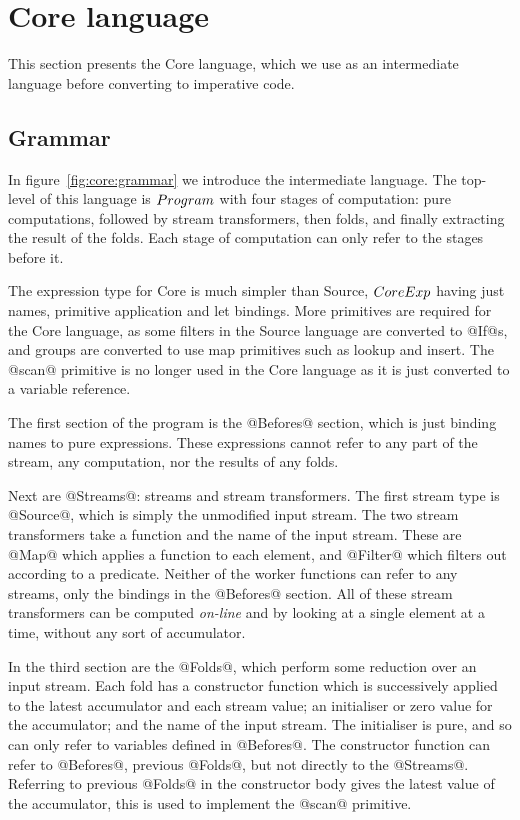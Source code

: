 \section{Core language}
\label{s:Core}

This section presents the Core language, which we use as an intermediate language before converting to imperative code.

\subsection{Grammar}



In figure~\ref{fig:core:grammar} we introduce the intermediate language.
The top-level of this language is $\mit{Program}$ with four stages of computation: pure computations, followed by stream transformers, then folds, and finally extracting the result of the folds.
Each stage of computation can only refer to the stages before it.

The expression type for Core is much simpler than Source, $\mit{CoreExp}$ having just names, primitive application and let bindings.
More primitives are required for the Core language, as some filters in the Source language are converted to @If@s, and groups are converted to use map primitives such as lookup and insert.
The @scan@ primitive is no longer used in the Core language as it is just converted to a variable reference.

The first section of the program is the @Befores@ section, which is just binding names to pure expressions.
These expressions cannot refer to any part of the stream, any computation, nor the results of any folds.

Next are @Streams@: streams and stream transformers.
The first stream type is @Source@, which is simply the unmodified input stream.
The two stream transformers take a function and the name of the input stream.
These are @Map@ which applies a function to each element, and @Filter@ which filters out according to a predicate.
Neither of the worker functions can refer to any streams, only the bindings in the @Befores@ section.
All of these stream transformers can be computed \emph{on-line} and by looking at a single element at a time, without any sort of accumulator.

In the third section are the @Folds@, which perform some reduction over an input stream.
Each fold has a constructor function which is successively applied to the latest accumulator and each stream value; an initialiser or zero value for the accumulator; and the name of the input stream.
The initialiser is pure, and so can only refer to variables defined in @Befores@.
The constructor function can refer to @Befores@, previous @Folds@, but not directly to the @Streams@.
Referring to previous @Folds@ in the constructor body gives the latest value of the accumulator, this is used to implement the @scan@ primitive.

